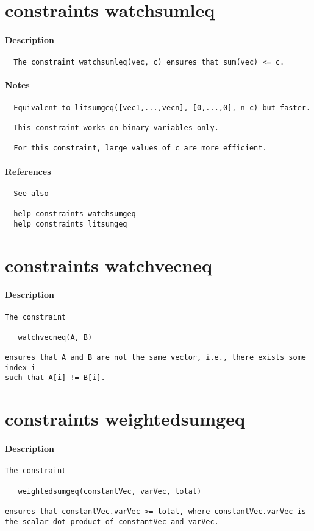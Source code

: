 \section{constraints watchsumleq}
\paragraph{Description}
{\footnotesize
\begin{verbatim}
  The constraint watchsumleq(vec, c) ensures that sum(vec) <= c.
\end{verbatim}
}
\paragraph{Notes}
{\footnotesize
\begin{verbatim}
  Equivalent to litsumgeq([vec1,...,vecn], [0,...,0], n-c) but faster.

  This constraint works on binary variables only.

  For this constraint, large values of c are more efficient.
\end{verbatim}
}
\paragraph{References}
{\footnotesize
\begin{verbatim}
  See also

  help constraints watchsumgeq 
  help constraints litsumgeq
\end{verbatim}
}
\section{constraints watchvecneq}
\paragraph{Description}
{\footnotesize
\begin{verbatim}
The constraint

   watchvecneq(A, B)

ensures that A and B are not the same vector, i.e., there exists some index i
such that A[i] != B[i].
\end{verbatim}
}
\section{constraints weightedsumgeq}
\paragraph{Description}
{\footnotesize
\begin{verbatim}
The constraint

   weightedsumgeq(constantVec, varVec, total)

ensures that constantVec.varVec >= total, where constantVec.varVec is
the scalar dot product of constantVec and varVec.
\end{verbatim}
}
